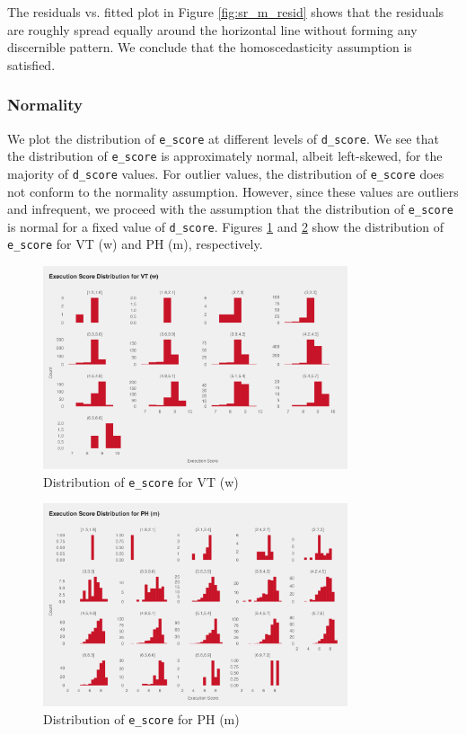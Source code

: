 \documentclass{article}
\begin{document}
\noindent The residuals vs. fitted plot in Figure \ref{fig:sr_m_resid} shows that the residuals 
are roughly spread equally around the horizontal line without forming any discernible pattern. 
We conclude that the homoscedasticity assumption is satisfied.

\subsubsection{Normality}
We plot the distribution of \texttt{e\_score} at different levels of \texttt{d\_score}.
We see that the distribution of \texttt{e\_score} is approximately normal, albeit 
left-skewed, for the majority of \texttt{d\_score} values. For outlier values, 
the distribution of \texttt{e\_score} does not conform to the normality assumption. 
However, since these values are outliers and infrequent, we proceed with the assumption
that the distribution of \texttt{e\_score} is normal for a fixed value of \texttt{d\_score}.
Figures \ref{fig:fx_m_norm} and \ref{fig:ph_m_norm} show the distribution of \texttt{e\_score} 
for VT (w) and PH (m), respectively.
\begin{figure}[H]
    \centering
    \includegraphics[width=0.8\textwidth]{../plots//w_VT.png}
    \caption{Distribution of \texttt{e\_score} for VT (w)}
    \label{fig:fx_m_norm}
\end{figure}

\begin{figure}[H]
    \centering
    \includegraphics[width=0.8\textwidth]{../plots//m_PH.png}
    \caption{Distribution of \texttt{e\_score} for PH (m)}
    \label{fig:ph_m_norm}
\end{figure}
\end{document}
